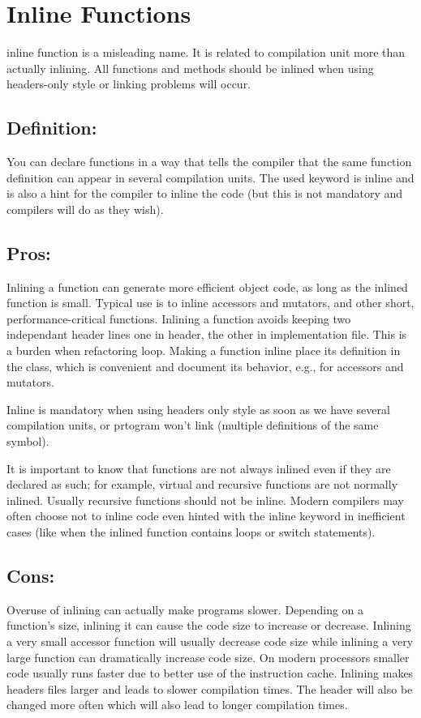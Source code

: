 \documentclass[11pt]{report}
\begin{document}
\section{Inline Functions}

inline function is a misleading name. It is related to compilation unit more than actually inlining. All functions and methods should be inlined when using headers-only style or linking problems will occur.

\subsection{Definition:} You can declare functions in a way that tells the compiler that the same function definition can appear in several compilation units. The used keyword is inline and is also a hint for the compiler to inline the code (but this is not mandatory and compilers will do as they wish).

\subsection{Pros:} Inlining a function can generate more efficient object code, as long as the inlined function is small. Typical use is to inline accessors and mutators, and other short, performance-critical functions.
Inlining a function avoids keeping two independant header lines one in header, the other in implementation file. This is a burden when refactoring loop.
Making a function inline place its definition in the class, which is convenient and document its behavior, e.g., for accessors and mutators. 

Inline is mandatory when using headers only style as soon as we have several compilation units, or prtogram won't link (multiple definitions of the same symbol).

It is important to know that functions are not always inlined even if they are declared as such; for example, virtual and recursive functions are not normally inlined. Usually recursive functions should not be inline. Modern compilers may often choose not to inline code even hinted with the inline keyword in inefficient cases (like when the inlined function contains loops or switch statements).

\subsection{Cons:} Overuse of inlining can actually make programs slower. Depending on a function's size, inlining it can cause the code size to increase or decrease. Inlining a very small accessor function will usually decrease code size while inlining a very large function can dramatically increase code size. On modern processors smaller code usually runs faster due to better use of the instruction cache.
Inlining makes headers files larger and leads to slower compilation times. 
The header will also be changed more often which will also lead to longer compilation times.
\end{document}

